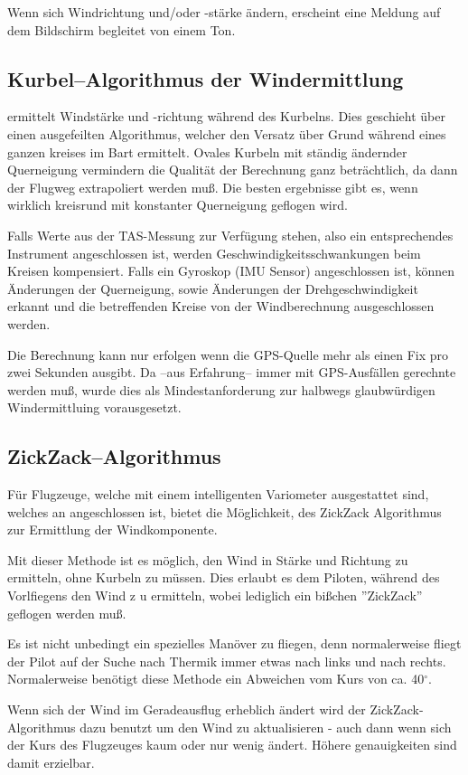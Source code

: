 Wenn sich Windrichtung und/oder -stärke ändern, erscheint eine Meldung  auf dem Bildschirm begleitet von einem Ton.
\subsection*{Kurbel--Algorithmus der Windermittlung}
\xc ermittelt Windstärke und -richtung während des Kurbelns. Dies geschieht über einen ausgefeilten Algorithmus, welcher den Versatz über Grund während eines ganzen kreises im Bart ermittelt. Ovales Kurbeln mit ständig ändernder Querneigung vermindern die Qualität der Berechnung ganz beträchtlich, da dann der Flugweg extrapoliert werden muß. Die besten ergebnisse gibt es, wenn wirklich kreisrund mit konstanter Querneigung geflogen wird.

Falls Werte aus der TAS-Messung zur Verfügung stehen, also ein entsprechendes Instrument angeschlossen ist,
werden Geschwindigkeitsschwankungen beim Kreisen kompensiert.
Falls ein Gyroskop (IMU Sensor) angeschlossen ist, können Änderungen der Querneigung,
sowie Änderungen der Drehgeschwindigkeit erkannt und die betreffenden Kreise von der Windberechnung ausgeschlossen werden. 

Die Berechnung kann nur erfolgen wenn die GPS-Quelle mehr als einen Fix pro zwei Sekunden ausgibt. 
Da --aus Erfahrung-- immer mit GPS-Ausfällen gerechnte werden muß, wurde dies als Mindestanforderung zur halbwegs glaubwürdigen Windermittluing vorausgesetzt.  
 
\subsection*{ZickZack--Algorithmus}
Für Flugzeuge, welche mit einem intelligenten Variometer ausgestattet sind, welches
an \xc angeschlossen ist, bietet \xc die Möglichkeit, des ZickZack Algorithmus
zur Ermittlung der Windkomponente.

Mit dieser Methode ist es möglich, den Wind in Stärke und Richtung zu ermitteln, ohne Kurbeln zu müssen.
Dies erlaubt es dem Piloten,  während des Vorlfiegens den Wind z u ermitteln, wobei lediglich ein
bißchen ''ZickZack'' geflogen werden muß.

Es ist nicht unbedingt ein spezielles Manöver zu fliegen, denn normalerweise  fliegt der Pilot auf
der Suche nach Thermik immer etwas nach links und nach rechts. Normalerweise benötigt diese
Methode ein Abweichen vom Kurs von ca. 40$^\circ$.

Wenn sich der Wind im Geradeausflug erheblich ändert wird der ZickZack-Algorithmus dazu benutzt
um den Wind zu aktualisieren - auch dann wenn sich der Kurs des Flugzeuges kaum oder nur wenig ändert.
Höhere genauigkeiten sind damit erzielbar.

